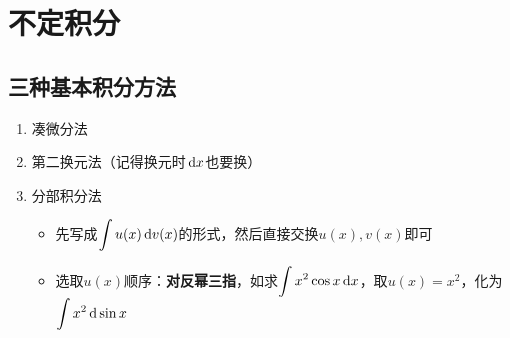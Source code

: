 
\section{不定积分}
\label{sec:indefinite_integration}
\subsection{三种基本积分方法}
\begin{enumerate}
	\item 凑微分法
	\item 第二换元法（记得换元时$\,\mathrm{d} x$也要换）
	\item 分部积分法
	\begin{itemize}
		\item 先写成$\displaystyle\int u(x)\,\mathrm{d} v(x)$的形式，然后直接交换$u(x),v(x)$即可
		\item 选取$u(x)$顺序：\textbf{对反幂三指}，如求$\displaystyle\int x^2\cos x\,\mathrm{d} x$，取$u(x)=x^2$，化为$\displaystyle\int x^2\,\mathrm{d}\sin x$
	\end{itemize}
\end{enumerate}

